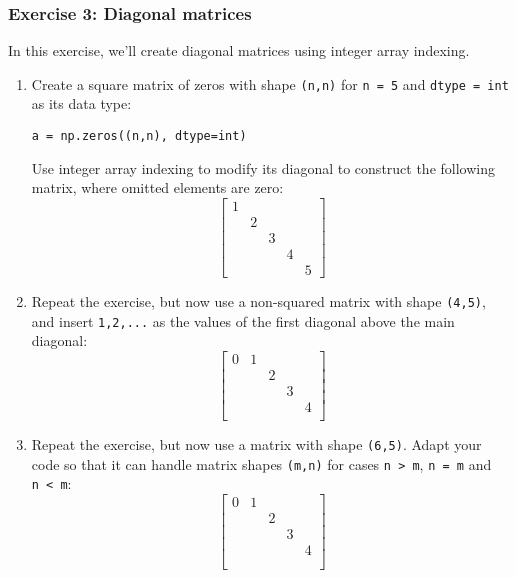 \documentclass{scrartcl}
\begin{document}
    \hypertarget{exercise-3-diagonal-matrices}{%
\subsubsection{Exercise 3: Diagonal
matrices}\label{exercise-3-diagonal-matrices}}

In this exercise, we'll create diagonal matrices using integer array
indexing.

\begin{enumerate}
\def\labelenumi{\arabic{enumi}.}
\item
  Create a square matrix of zeros with shape \texttt{(n,n)} for
  \texttt{n\ =\ 5} and \texttt{dtype\ =\ int} as its data type:

\begin{verbatim}
a = np.zeros((n,n), dtype=int)
\end{verbatim}

  Use integer array indexing to modify its diagonal to construct the
  following matrix, where omitted elements are zero: \[
  \begin{bmatrix}
  1 &   &   &   & \\
    & 2 &   &   & \\
    &   & 3 &   & \\
    &   &   & 4 & \\
    &   &   &   & 5     
  \end{bmatrix}
  \]
\item
  Repeat the exercise, but now use a non-squared matrix with shape
  \texttt{(4,5)}, and insert \texttt{1,2,...} as the values of the first
  diagonal above the main diagonal: \[
  \begin{bmatrix}
   0 & 1 &   &   &   \\
   &   & 2 &   &   \\
   &   &   & 3 &   \\
   &   &   &   & 4 \\
  \end{bmatrix}
  \]
\item
  Repeat the exercise, but now use a matrix with shape \texttt{(6,5)}.
  Adapt your code so that it can handle matrix shapes \texttt{(m,n)} for
  cases \texttt{n\ \textgreater{}\ m}, \texttt{n\ =\ m} and
  \texttt{n\ \textless{}\ m}: \[
  \begin{bmatrix}
   0 & 1 &   &   &   \\
   &   & 2 &   &   \\
   &   &   & 3 &   \\
   &   &   &   & 4 \\
   &&&& \\
   &&&&
  \end{bmatrix}
  \]
\end{enumerate}
\end{document}
